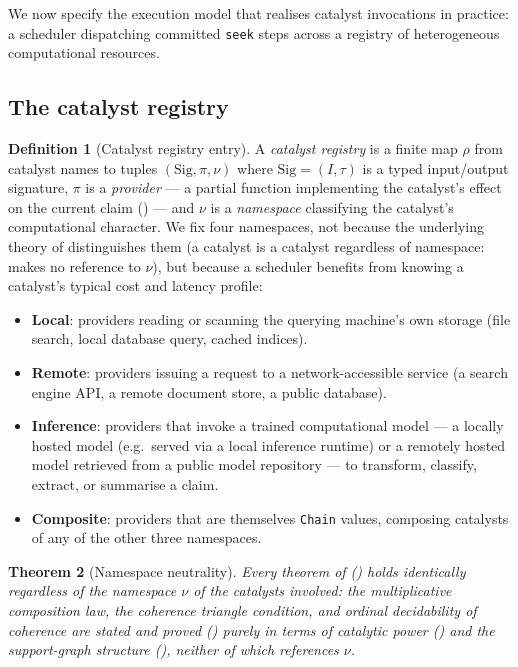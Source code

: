 \documentclass[11pt,twocolumn,a4paper]{article}
\theoremstyle{thmstyle}
\newtheorem{theorem}{Theorem}[section]
\theoremstyle{definition}
\newtheorem{definition}[theorem]{Definition}
\theoremstyle{remark}
\begin{document}
We now specify the execution model that realises catalyst invocations in
practice: a scheduler dispatching committed \texttt{seek} steps across a
registry of heterogeneous computational resources.

\subsection{The catalyst registry}

\begin{definition}[Catalyst registry entry]
\label{def:registry}
A \emph{catalyst registry} is a finite map $\rho$ from catalyst names to
tuples $(\mathrm{Sig},\pi,\nu)$ where $\mathrm{Sig}=(I,\tau)$ is a typed
input/output signature, $\pi$ is a \emph{provider} --- a partial function
implementing the catalyst's effect on the current claim
() --- and $\nu$ is a \emph{namespace} classifying the
catalyst's computational character. We fix four namespaces, not because
the underlying theory of  distinguishes them (a
catalyst is a catalyst regardless of namespace:  makes no
reference to $\nu$), but because a scheduler benefits from knowing a
catalyst's typical cost and latency profile:
\begin{itemize}[leftmargin=1.4em,itemsep=1pt]
\item \textbf{Local}: providers reading or scanning the querying machine's
  own storage (file search, local database query, cached indices).
\item \textbf{Remote}: providers issuing a request to a network-accessible
  service (a search engine API, a remote document store, a public
  database).
\item \textbf{Inference}: providers that invoke a trained computational
  model --- a locally hosted model (e.g.\ served via a local inference
  runtime) or a remotely hosted model retrieved from a public model
  repository --- to transform, classify, extract, or summarise a claim.
\item \textbf{Composite}: providers that are themselves \texttt{Chain}
  values, composing catalysts of any of the other three namespaces.
\end{itemize}
\end{definition}

\begin{theorem}[Namespace neutrality]
\label{thm:namespace-neutral}
Every theorem of  () holds identically
regardless of the namespace $\nu$ of the catalysts involved: the
multiplicative composition law, the coherence triangle condition, and
ordinal decidability of coherence are stated and proved
() purely in terms of catalytic power
() and the support-graph structure (),
neither of which references $\nu$.
\end{theorem}
\end{document}
